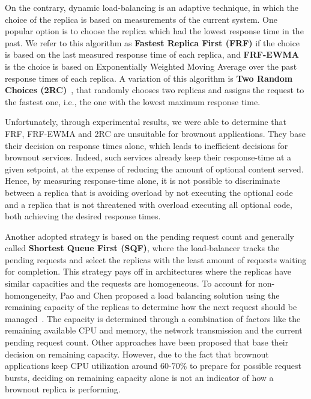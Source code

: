 On the contrary, dynamic load-balancing is an adaptive technique, in
which the choice of the replica is based on measurements of the
current system.  One popular option is to choose the replica which had
the lowest response time in the past.  We refer to this algorithm as
\textbf{Fastest Replica First (FRF)} if the choice is based on the
last measured response time of each replica, and \textbf{FRF-EWMA} is
the choice is based on Exponentially Weighted Moving Average over the
past response times of each replica.  A variation of this algorithm is
\textbf{Two Random Choices (2RC)}~\cite{2RC}, that randomly chooses
two replicas and assigns the request to the fastest one, i.e., the one
with the lowest maximum response time.

Unfortunately, through experimental results, we were able to determine
that FRF, FRF-EWMA and 2RC are unsuitable for brownout
applications. They base their decision on response times alone, which
leads to inefficient decisions for brownout services. Indeed, such
services already keep their response-time at a given setpoint, at the
expense of reducing the amount of optional content served. Hence, by
measuring response-time alone, it is not possible to discriminate
between a replica that is avoiding overload by not executing the
optional code and a replica that is not threatened with overload
executing all optional code, both achieving the desired response
times.

Another adopted strategy is based on the pending request count and
generally called \textbf{Shortest Queue First (SQF)}, where the
load-balancer tracks the pending requests and select the replicas with
the least amount of requests waiting for completion. This strategy
pays off in architectures where the replicas have similar capacities
and the requests are homogeneous. To account for non-homongeneity, Pao
and Chen proposed a load balancing solution using the remaining
capacity of the replicas to determine how the next request should be
managed~\cite{feedbackintensive}. The capacity is determined through a
combination of factors like the remaining available CPU and memory,
the network transmission and the current pending request count.  Other
approaches have been proposed that base their decision on remaining
capacity. However, due to the fact that brownout applications keep CPU
utilization around $60$-$70\%$ to prepare for possible request bursts,
deciding on remaining capacity alone is not an indicator of how a
brownout replica is performing.


